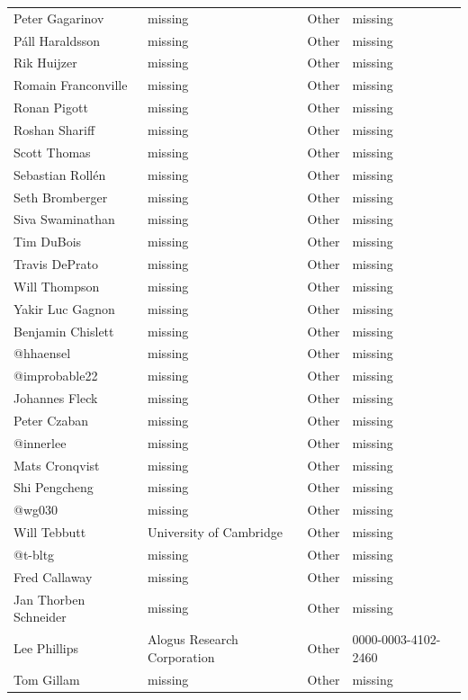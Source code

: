 \begin{longtable}{p{4cm}p{4cm}ll}
  Peter Gagarinov & missing & Other & missing \\
  Páll Haraldsson & missing & Other & missing \\
  Rik Huijzer & missing & Other & missing \\
  Romain Franconville & missing & Other & missing \\
  Ronan Pigott & missing & Other & missing \\
  Roshan Shariff & missing & Other & missing \\
  Scott Thomas & missing & Other & missing \\
  Sebastian Rollén & missing & Other & missing \\
  Seth Bromberger & missing & Other & missing \\
  Siva Swaminathan & missing & Other & missing \\
  Tim DuBois & missing & Other & missing \\
  Travis DePrato & missing & Other & missing \\
  Will Thompson & missing & Other & missing \\
  Yakir Luc Gagnon & missing & Other & missing \\
  Benjamin Chislett & missing & Other & missing \\
  @hhaensel & missing & Other & missing \\
  @improbable22 & missing & Other & missing \\
  Johannes Fleck & missing & Other & missing \\
  Peter Czaban & missing & Other & missing \\
  @innerlee & missing & Other & missing \\
  Mats Cronqvist & missing & Other & missing \\
  Shi Pengcheng & missing & Other & missing \\
  @wg030 & missing & Other & missing \\
  Will Tebbutt & University of Cambridge & Other & missing \\
  @t-bltg & missing & Other & missing \\
  Fred Callaway & missing & Other & missing \\
  Jan Thorben Schneider & missing & Other & missing \\
  Lee Phillips & Alogus Research Corporation & Other & 0000-0003-4102-2460 \\
  Tom Gillam & missing & Other & missing \\\hline\hline
\end{longtable}

